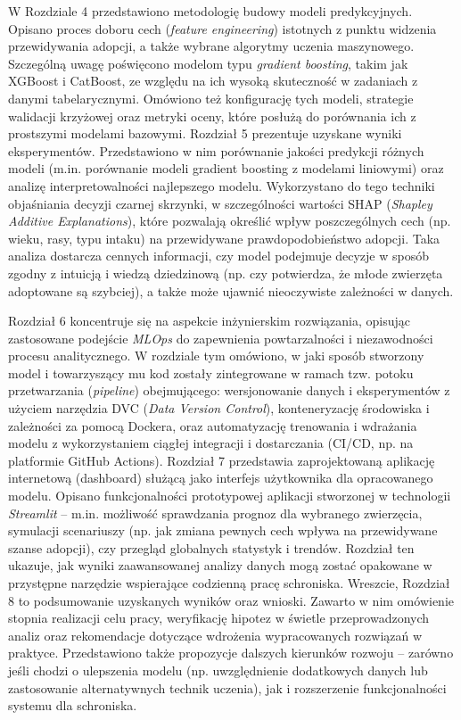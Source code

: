 W Rozdziale 4 przedstawiono metodologię budowy modeli predykcyjnych. Opisano proces doboru cech (\emph{feature engineering}) istotnych z punktu widzenia przewidywania adopcji, a także wybrane algorytmy uczenia maszynowego. Szczególną uwagę poświęcono modelom typu \emph{gradient boosting}, takim jak XGBoost i CatBoost, ze względu na ich wysoką skuteczność w zadaniach z danymi tabelarycznymi. Omówiono też konfigurację tych modeli, strategie walidacji krzyżowej oraz metryki oceny, które posłużą do porównania ich z prostszymi modelami bazowymi. Rozdział 5 prezentuje uzyskane wyniki eksperymentów. Przedstawiono w nim porównanie jakości predykcji różnych modeli (m.in. porównanie modeli gradient boosting z modelami liniowymi) oraz analizę interpretowalności najlepszego modelu. Wykorzystano do tego techniki objaśniania decyzji czarnej skrzynki, w szczególności wartości SHAP (\emph{Shapley Additive Explanations}), które pozwalają określić wpływ poszczególnych cech (np. wieku, rasy, typu intaku) na przewidywane prawdopodobieństwo adopcji. Taka analiza dostarcza cennych informacji, czy model podejmuje decyzje w sposób zgodny z intuicją i wiedzą dziedzinową (np. czy potwierdza, że młode zwierzęta adoptowane są szybciej), a także może ujawnić nieoczywiste zależności w danych.

Rozdział 6 koncentruje się na aspekcie inżynierskim rozwiązania, opisując zastosowane podejście \emph{MLOps} do zapewnienia powtarzalności i niezawodności procesu analitycznego. W rozdziale tym omówiono, w jaki sposób stworzony model i towarzyszący mu kod zostały zintegrowane w ramach tzw. potoku przetwarzania (\emph{pipeline}) obejmującego: wersjonowanie danych i eksperymentów z użyciem narzędzia DVC (\emph{Data Version Control}), konteneryzację środowiska i zależności za pomocą Dockera, oraz automatyzację trenowania i wdrażania modelu z wykorzystaniem ciągłej integracji i dostarczania (CI/CD, np. na platformie GitHub Actions). Rozdział 7 przedstawia zaprojektowaną aplikację internetową (dashboard) służącą jako interfejs użytkownika dla opracowanego modelu. Opisano funkcjonalności prototypowej aplikacji stworzonej w technologii \emph{Streamlit} – m.in. możliwość sprawdzania prognoz dla wybranego zwierzęcia, symulacji scenariuszy (np. jak zmiana pewnych cech wpływa na przewidywane szanse adopcji), czy przegląd globalnych statystyk i trendów. Rozdział ten ukazuje, jak wyniki zaawansowanej analizy danych mogą zostać opakowane w przystępne narzędzie wspierające codzienną pracę schroniska. Wreszcie, Rozdział 8 to podsumowanie uzyskanych wyników oraz wnioski. Zawarto w nim omówienie stopnia realizacji celu pracy, weryfikację hipotez w świetle przeprowadzonych analiz oraz rekomendacje dotyczące wdrożenia wypracowanych rozwiązań w praktyce. Przedstawiono także propozycje dalszych kierunków rozwoju – zarówno jeśli chodzi o ulepszenia modelu (np. uwzględnienie dodatkowych danych lub zastosowanie alternatywnych technik uczenia), jak i rozszerzenie funkcjonalności systemu dla schroniska.

